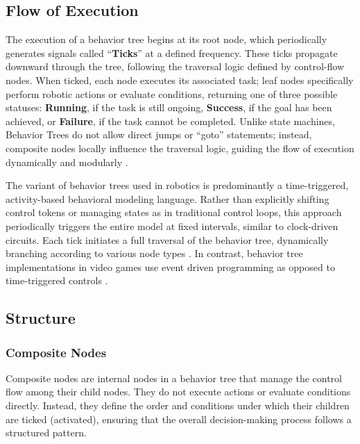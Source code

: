 \documentclass{CSSRforAfrica}
\begin{document}
\subsection{Flow of Execution}
\label{section:flow}
The execution of a behavior tree begins at its root node, which periodically generates signals called ``\textbf{Ticks}'' at a defined frequency. These ticks propagate downward through the tree, following the traversal logic defined by control-flow nodes. When ticked, each node executes its associated task; leaf nodes specifically perform robotic actions or evaluate conditions, returning one of three possible statuses: \textbf{Running}, if the task is still ongoing, \textbf{Success}, if the goal has been achieved, or \textbf{Failure}, if the task cannot be completed. Unlike state machines, Behavior Trees do not allow direct jumps or ``goto'' statements; instead, composite nodes locally influence the traversal logic, guiding the flow of execution dynamically and modularly \cite{Ghzoulietal2020,Iovinoetal2020}.

The variant of behavior trees used in robotics is predominantly a time-triggered, activity-based behavioral modeling language. Rather than explicitly shifting control tokens or managing states as in traditional control loops, this approach periodically triggers the entire model at fixed intervals, similar to clock-driven circuits. Each tick initiates a full traversal of the behavior tree, dynamically branching according to various node types \cite{Ghzoulietal2023}. In contrast, behavior tree implementations in video games use event driven programming as opposed to time-triggered controls
 \cite{Ghzoulietal2020,UnrealEngineBehaviorTree}.

\subsection{Structure}
\label{section:structure}

\subsubsection{Composite Nodes}
Composite nodes are internal nodes in a behavior tree that manage the control flow among their child nodes. They do not execute actions or evaluate conditions directly. Instead, they define the order and conditions under which their children are ticked (activated), ensuring that the overall decision-making process follows a structured pattern.
\end{document}
